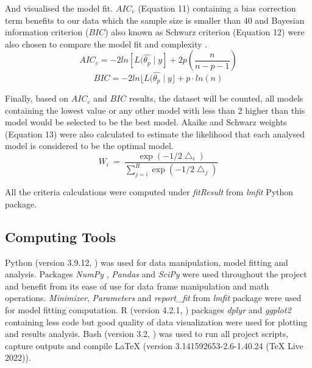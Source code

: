 \documentclass[a4paper]{report}
\begin{document}
\begin{linenumbers}
        And visualised the model fit. $AIC_c$ (Equation 11) containing a bias correction term benefits to our data which the sample size is smaller than 40 and Bayesian information criterion ($BIC$) also known as Schwarz criterion (Equation 12) were also chosen to compare the model fit and complexity \citep{johnson2004model}. 
        \begin{equation}
            AIC_{c} = -2ln [L(\hat{\theta_{p}}\mid{y} ] + 2p (\frac{n}{n - p - 1})
            \label{AIC_c}
        \end{equation}
        \begin{equation}
            BIC = -2ln\lfloor{L(\hat{\theta_{p}}\mid{y}}\rfloor + p \cdot ln(n)
            \label{BIC}
        \end{equation}
        
        Finally, based on $AIC_c$ and $BIC$ results, the dataset will be counted, all models containing the lowest value or any other model with less than 2 higher than this model would be selected to be the best model. Akaike and Schwarz weights (Equation 13) \citep{johnson2004model} were also calculated to estimate the likelihood that each analysed model is considered to be the optimal model.
         \begin{equation}
            W_i\ =\ \frac{\exp \left( -1/2\bigtriangleup _i \right)}{\sum_{j=i}^R{\exp \left( -1/2\bigtriangleup _j \right)}}
            \label{Akaike and Schwarz weights}
        \end{equation}
        
         All the criteria calculations were computed under \emph{fitResult} from \emph{lmfit} Python package.

        \subsection{Computing Tools}
        Python (version 3.9.12, \citealt{10.5555/1593511}) was used for data manipulation, model fitting and analysis. Packages \emph{NumPy} \citep{2020NumPy-Array}, \emph{Pandas} \citep{mckinney2010data} and \emph{SciPy} \citep{2020SciPy-NMeth} were used throughout the project and benefit from its ease of use for data frame manipulation and math operations. \emph{Minimizer}, \emph{Parameters} and \emph{report\_fit} from \emph{lmfit} package \citep{matt_newville_2022_7370358} were used for model fitting computation. R (version 4.2.1, \citealt{R}) packages \emph{dplyr} \citep{dplyr} and \emph{ggplot2} \citep{ggplot2} containing less code but good quality of data visualization were used for plotting and results analysis. Bash (version 3.2, \citealt{gnu2007free}) was used to run all project scripts, capture outputs and compile LaTeX (version 3.141592653-2.6-1.40.24 (TeX Live 2022)).


\end{linenumbers}
\end{document}
